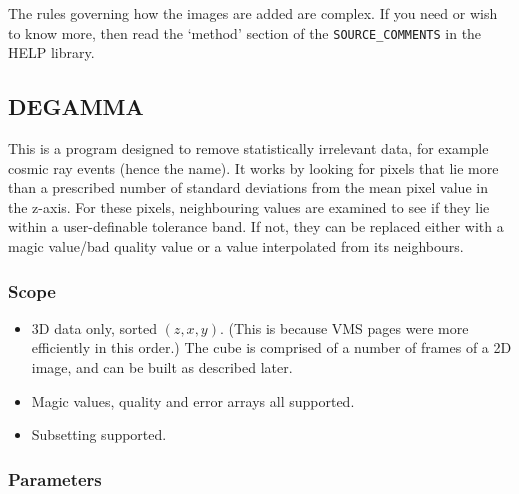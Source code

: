 The rules governing how the images are added are complex. If you need or wish
to know more, then read the `method' section of the {\tt SOURCE\_COMMENTS} in 
the HELP library.  

\subsection{DEGAMMA}

This is a program designed to remove statistically irrelevant data, for example 
cosmic ray events (hence the name). It works by looking for pixels that lie
more than a prescribed number of standard deviations from the mean pixel value
in the z-axis. For these pixels, neighbouring values are examined to see if
they lie within a user-definable tolerance band. If not, they can be replaced
either with a magic value/bad quality value or a value interpolated from its
neighbours.

\subsubsection{Scope}

\begin{itemize}
\item 3D data only, sorted $(z,x,y)$. (This is because VMS pages were more
efficiently in this order.) The cube is comprised of a number of frames of a 2D
image, and can be built as described later.                                 
\item Magic values, quality and error arrays all supported.
\item Subsetting supported.
\end{itemize}

\subsubsection{Parameters}


